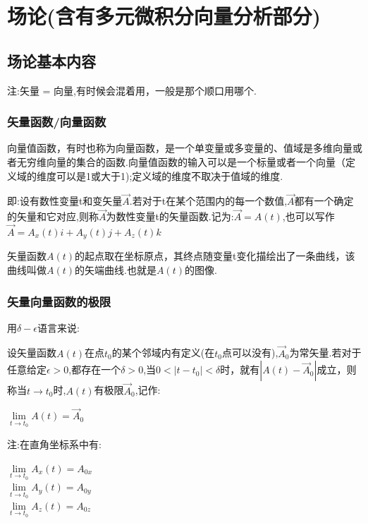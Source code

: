 \documentclass[UTF8,12pt]{ctexbook}
\newcommand{\limNormal}[1]{\lim\limits_{#1}}
\begin{document}
{{{ }%

\section{场论(含有多元微积分向量分析部分)}{

  \subsection{场论基本内容}{
    注:矢量 = 向量,有时候会混着用，一般是那个顺口用哪个.

    \subsubsection{矢量函数/向量函数}{
      向量值函数，有时也称为向量函数，是一个单变量或多变量的、值域是多维向量或者无穷维向量的集合的函数.向量值函数的输入可以是一个标量或者一个向量（定义域的维度可以是1或大于1);定义域的维度不取决于值域的维度.

      即:设有数性变量t和变矢量$\vec{A}$.若对于t在某个范围内的每一个数值,$\vec{A}$都有一个确定的矢量和它对应,则称$\vec{A}$为数性变量t的矢量函数.记为:$\vec{A} = A(t)$,也可以写作$\vec{A} = A_x(t)i + A_y(t)j + A_z(t)k$

      矢量函数$A(t)$的起点取在坐标原点，其终点随变量t变化描绘出了一条曲线，该曲线叫做$A(t)$的矢端曲线.也就是$A(t)$的图像.
    }%

    \subsubsection{矢量向量函数的极限}{
      用$\delta-\epsilon$语言来说:

      设矢量函数$A(t)$在点$t_0$的某个邻域内有定义(在$t_0$点可以没有),$\vec{A}_0$为常矢量.若对于任意给定$\epsilon > 0$,都存在一个$\delta > 0$,当$0 < |t - t_0| < \delta$时，就有$|A(t) - \vec{A}_0|$成立，则称当$t \to t_0$时,$A(t)$有极限$\vec{A}_0$,记作:

      \begin{center}
        $\limNormal{t \to t_0}A(t) = \vec{A}_0$
      \end{center}

      注:在直角坐标系中有:

      \begin{center}
        $\limNormal{t \to t_0}A_x(t) = A_{0x}$ \\
        $\limNormal{t \to t_0}A_y(t) = A_{0y}$ \\
        $\limNormal{t \to t_0}A_z(t) = A_{0z}$
      \end{center}

}}}}}
\end{document}
